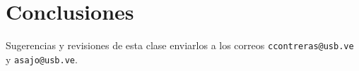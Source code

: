\chapter*{Conclusiones}

Sugerencias y revisiones de esta clase enviarlos a los correos \texttt{ccontreras@usb.ve} y \texttt{asajo@usb.ve}.